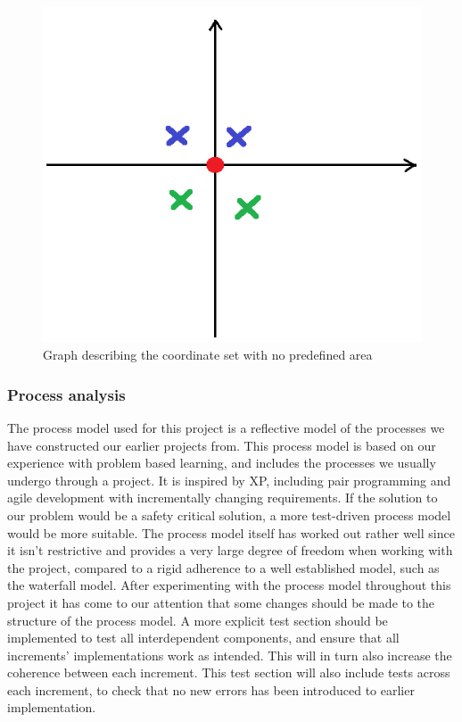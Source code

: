 \begin{figure}[h]
	\centering
	\includegraphics[scale=0.5]{billeder/discussion-graph.png}
	\caption{Graph describing the coordinate set with no predefined area}
	\label{figure:discussion-graph}
\end{figure}


\subsubsection{Process analysis}
The process model used for this project is a reflective model of the processes we have constructed our earlier projects from. This process model is based on our experience with problem based learning, and includes the processes we usually undergo through a project. It is inspired by XP, including pair programming and agile development with incrementally changing requirements. If the solution to our problem would be a safety critical solution, a more test-driven process model would be more suitable. \newline
The process model itself has worked out rather well since it isn’t restrictive and provides a very large degree of freedom when working with the project, compared to a rigid adherence to a well established model, such as the waterfall model. \newline
After experimenting with the process model throughout this project it has come to our attention that some changes should be made to the structure of the process model. A more explicit test section should be implemented to test all interdependent components, and ensure that all increments’ implementations work as intended. This will in turn also increase the coherence between each increment. This test section will also include tests across each increment, to check that no new errors has been introduced to earlier implementation.





